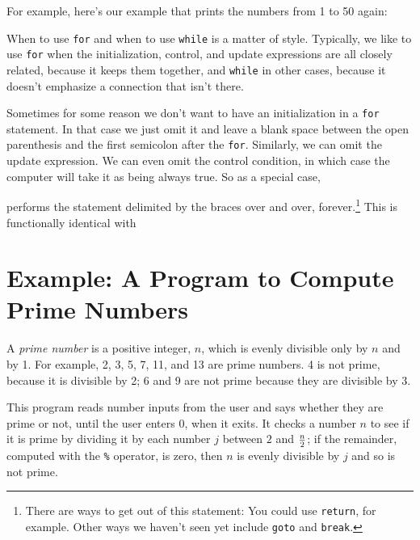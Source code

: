 For example, here's our example that prints the numbers from 1 to 50
again:


When to use {\tt for} and when to use {\tt while} is a matter of style.
Typically, we like to use {\tt for} when the initialization, control,
and update expressions are all closely related, because it keeps them
together, and {\tt while} in other cases, because it doesn't emphasize a
connection that isn't there.

Sometimes for some reason we don't want to have an initialization in a
{\tt for} statement.  In that case we just omit it and leave a blank
space between the open parenthesis and the first semicolon after the
{\tt for}.  Similarly, we can omit the update expression.  We can even
omit the control condition, in which case the computer will take it as
being always true.  So as a special case, 

\begin{flushleft}
\verb% for ( ; ; ) { ... } %
\end{flushleft}

\noindent performs the statement delimited by the braces over and over,
forever.\footnote{There are ways to get out of this statement:  You
could use {\tt return}, for example.  Other ways we haven't seen yet
include {\tt goto} and {\tt break}.}  This is functionally identical with

\begin{flushleft}
\verb% while ( 1 ) { ... } %
\end{flushleft}

\section{Example: A Program to Compute Prime Numbers}

A {\em prime number} is a positive integer, $n$, which is evenly
divisible only by $n$ and by 1.  For example, 2, 3, 5, 7, 11, and 13 are
prime numbers.  4 is not prime, because it is divisible by 2; 6 and 9
are not prime because they are divisible by 3.

This program reads number inputs from the user and says whether they are
prime or not, until the user enters 0, when it exits.  It checks a
number $n$ to see if it is prime by dividing it by each number $j$ between
$2$ and $n\over 2$; if the remainder, computed with the {\tt\%}
operator, is zero, then $n$ is evenly divisible by $j$ and so is not
prime.  


